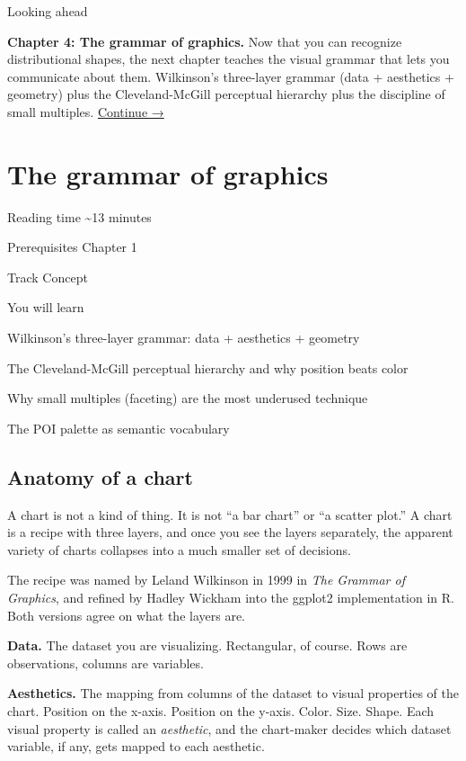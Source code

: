 \documentclass[
  letterpaper,
  11pt,
  twoside,
  openany]{scrbook}
\begin{document}
{Looking ahead}

\textbf{Chapter 4: The grammar of graphics.} Now that you can recognize
distributional shapes, the next chapter teaches the visual grammar that
lets you communicate about them. Wilkinson's three-layer grammar (data +
aesthetics + geometry) plus the Cleveland-McGill perceptual hierarchy
plus the discipline of small multiples.
\href{04-grammar-of-graphics.qmd}{Continue →}

\chapter{The grammar of graphics}\label{the-grammar-of-graphics}

{Reading time} {\textasciitilde13 minutes}

{Prerequisites} {Chapter 1}

{Track} {Concept}

{You will learn}

Wilkinson's three-layer grammar: data + aesthetics + geometry

The Cleveland-McGill perceptual hierarchy and why position beats color

Why small multiples (faceting) are the most underused technique

The POI palette as semantic vocabulary

\section{Anatomy of a chart}\label{anatomy-of-a-chart}

A chart is not a kind of thing. It is not ``a bar chart'' or ``a scatter
plot.'' A chart is a recipe with three layers, and once you see the
layers separately, the apparent variety of charts collapses into a much
smaller set of decisions.

The recipe was named by Leland Wilkinson in 1999 in \emph{The Grammar of
Graphics}, and refined by Hadley Wickham into the ggplot2 implementation
in R. Both versions agree on what the layers are.

\textbf{Data.} The dataset you are visualizing. Rectangular, of course.
Rows are observations, columns are variables.

\textbf{Aesthetics.} The mapping from columns of the dataset to visual
properties of the chart. Position on the x-axis. Position on the y-axis.
Color. Size. Shape. Each visual property is called an \emph{aesthetic},
and the chart-maker decides which dataset variable, if any, gets mapped
to each aesthetic.
\end{document}
